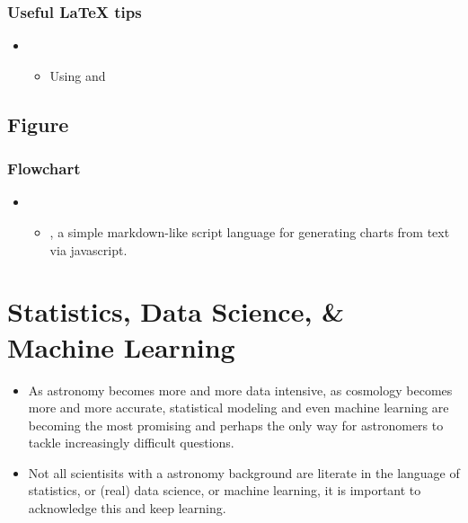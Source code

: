 \documentclass[letterpaper,10pt,english]{sphinxmanual}
\begin{document}
\subsubsection{Useful LaTeX tips}
\label{\detokenize{resource/research/writing_paper:useful-latex-tips}}\begin{itemize}
\item {} 
\begin{itemize}
\item {} 
Using  and 

\end{itemize}

\end{itemize}


\subsection{Figure}
\label{\detokenize{resource/research/writing_paper:figure}}

\subsubsection{Flowchart}
\label{\detokenize{resource/research/writing_paper:flowchart}}\begin{itemize}
\item {} 
\begin{itemize}
\item {} 
, a simple markdown-like script language for generating
charts from text via javascript.

\end{itemize}

\end{itemize}


\section{Statistics, Data Science, \& Machine Learning}
\label{\detokenize{stats_data_ml:statistics-data-science-machine-learning}}\label{\detokenize{stats_data_ml::doc}}\begin{itemize}
\item {} 
As astronomy becomes more and more data intensive, as cosmology becomes more and more accurate,
statistical modeling and even machine learning are becoming the most promising and perhaps the
only way for astronomers to tackle increasingly difficult questions.

\item {} 
Not all scientisits with a astronomy background are literate in the language of statistics, or
(real) data science, or machine learning, it is important to acknowledge this and keep learning.

\end{itemize}
\end{document}
